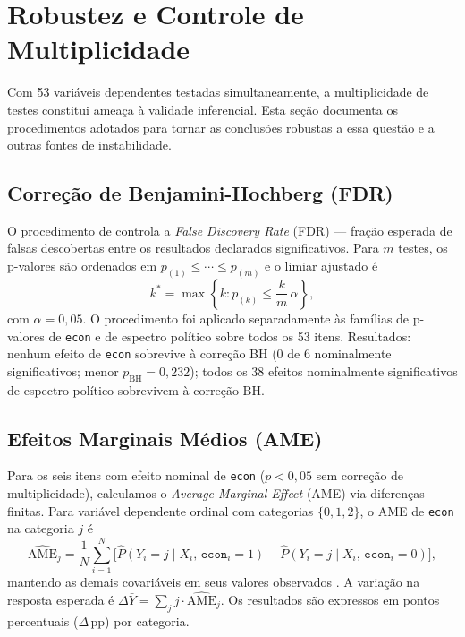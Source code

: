 \section{Robustez e Controle de Multiplicidade}
\label{sec:robustez_metodo}

Com 53 variáveis dependentes testadas simultaneamente, a multiplicidade de testes constitui ameaça à validade inferencial. Esta seção documenta os procedimentos adotados para tornar as conclusões robustas a essa questão e a outras fontes de instabilidade.

\subsection{Correção de Benjamini-Hochberg (FDR)}
\label{sec:fdr_bh}

O procedimento de  controla a \textit{False Discovery Rate} (FDR) — fração esperada de falsas descobertas entre os resultados declarados significativos. Para $m$ testes, os p-valores são ordenados em $p_{(1)} \leq \cdots \leq p_{(m)}$ e o limiar ajustado é
\begin{equation}\label{eq:bh}
k^{*} = \max\!\left\{k : p_{(k)} \leq \frac{k}{m}\,\alpha\right\},
\end{equation}
com $\alpha = 0{,}05$. O procedimento foi aplicado separadamente às famílias de p-valores de \texttt{econ} e de espectro político sobre todos os 53 itens. Resultados: nenhum efeito de \texttt{econ} sobrevive à correção BH (0 de 6 nominalmente significativos; menor $p_\mathrm{BH} = 0{,}232$); todos os 38 efeitos nominalmente significativos de espectro político sobrevivem à correção BH.

\subsection{Efeitos Marginais Médios (AME)}
\label{sec:ame}

Para os seis itens com efeito nominal de \texttt{econ} ($p < 0{,}05$ sem correção de multiplicidade), calculamos o \textit{Average Marginal Effect} (AME) via diferenças finitas. Para variável dependente ordinal com categorias $\{0,1,2\}$, o AME de \texttt{econ} na categoria $j$ é
\begin{equation}\label{eq:ame}
\widehat{\mathrm{AME}}_j = \frac{1}{N}\sum_{i=1}^{N}
\bigl[\hat{P}(Y_i=j \mid X_i,\,\texttt{econ}_i=1)
     - \hat{P}(Y_i=j \mid X_i,\,\texttt{econ}_i=0)\bigr],
\end{equation}
mantendo as demais covariáveis em seus valores observados \cite{longFreese2014}. A variação na resposta esperada é $\Delta\bar{Y} = \sum_j j \cdot \widehat{\mathrm{AME}}_j$. Os resultados são expressos em pontos percentuais ($\Delta$\,pp) por categoria.

